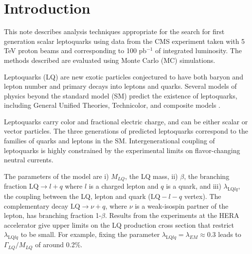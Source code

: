 \setcounter{page}{2}%

\section{Introduction}
This note describes analysis techniques 
appropriate for the
search for first generation scalar leptoquarks 
using data from the CMS experiment taken with 5 TeV proton beams and 
corresponding to 100 pb$^{-1}$ of integrated luminosity.
The methods described are evaluated using 
Monte Carlo (MC) simulations.

%
Leptoquarks (LQ) are new exotic particles conjectured to have both baryon and lepton number 
and primary decays into leptons and quarks. 
Several models of physics beyond the standard model (SM) predict the existence of leptoquarks,
including General Unified Theories, Technicolor, and composite models \cite{Acosta:1999ws}.  

Leptoquarks carry color and fractional electric charge, 
and can be either scalar or vector particles. The three generations of predicted leptoquarks 
correspond to the families of quarks and leptons in the SM.  Intergenerational coupling of 
leptoquarks is highly constrained by the experimental limits on flavor-changing neutral currents. 




The parameters of the model are i) $M_{LQ}$, the LQ mass, ii) $\beta$, 
the branching fraction 
$\mbox{LQ} \rightarrow l + q$
where $l$ is a charged lepton and $q$ is a quark, and
iii) $\lambda_{\mbox{LQ}lq}$, the coupling between the LQ, lepton and 
quark ($\mbox{LQ}-l-q$ vertex). 
The complementary decay $\mbox{LQ} \rightarrow \nu + q$, 
where $\nu$ is a weak-isospin partner of the lepton,
has branching fraction 1-$\beta$.
Results from the experiments at the HERA accelerator
give upper limits on the LQ production cross section that restrict  
$\lambda_{\mbox{LQ}lq}$ to be small\cite{Aktas:2005pr}. 
For example, fixing the parameter 
$\lambda_{\mbox{LQ}lq} = \lambda_{EM} \approx 0.3$ leads to 
$\Gamma_{LQ}/M_{LQ}$ of around 0.2\%. 



